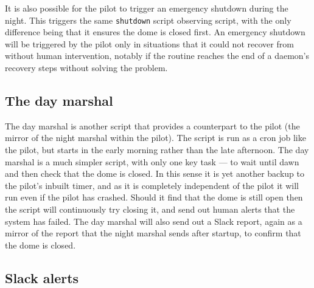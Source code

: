 \begin{colsection}
\begin{colsection}
It is also possible for the pilot to trigger an emergency shutdown during the night. This triggers the same \texttt{shutdown} script observing script, with the only difference being that it ensures the dome is closed first. An emergency shutdown will be triggered by the pilot only in situations that it could not recover from without human intervention, notably if the  routine reaches the end of a daemon's recovery steps without solving the problem.

\end{colsection}

\subsection{The day marshal}
\label{sec:day_marshal}
\begin{colsection}

The day marshal is another script that provides a counterpart to the pilot (the mirror of the night marshal within the pilot). The  script is run as a cron job like the pilot, but starts in the early morning rather than the late afternoon. The day marshal is a much simpler script, with only one key task --- to wait until dawn and then check that the dome is closed. In this sense it is yet another backup to the pilot's inbuilt  timer, and as it is completely independent of the pilot it will run even if the pilot has crashed. Should it find that the dome is still open then the script will continuously try closing it, and send out human alerts that the system has failed. The day marshal will also send out a Slack report, again as a mirror of the report that the night marshal sends after startup, to confirm that the dome is closed.

\end{colsection}

\subsection{Slack alerts}
\label{sec:slack}
\begin{colsection}


\end{colsection}
\end{colsection}
